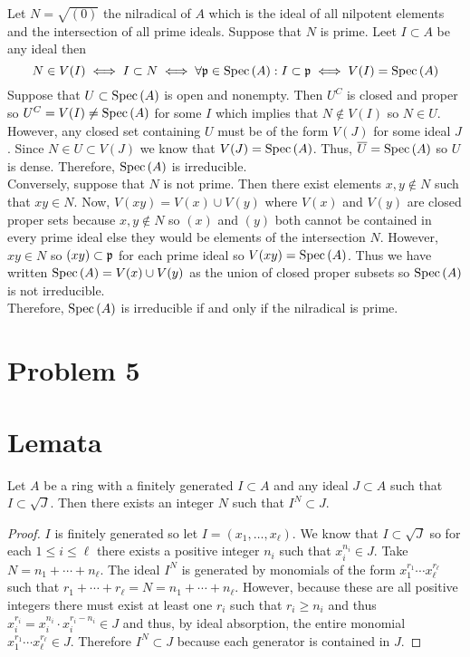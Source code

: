 \documentclass[12pt]{extarticle}
\begin{document}
Let $N = \sqrt{(0)}$ the nilradical of $A$ which is the ideal of all nilpotent elements and the intersection of all prime ideals. Suppose that $N$ is prime. Leet $I \subset A$ be any ideal then 
\[N \in V(I) \iff I \subset N \iff \forall \mathfrak{p} \in \mathrm{Spec}\left( A \right) : I \subset \mathfrak{p} \iff V(I) = \mathrm{Spec}\left( A \right)\]
Suppose that $U \subset \mathrm{Spec}\left( A \right)$ is open and nonempty. Then $U^C$ is closed and proper so $U^C = V(I) \neq \mathrm{Spec}\left( A \right)$ for some $I$ which implies that $N \notin V(I)$ so $N \in U$. However, any closed set containing $U$ must be of the form $V(J)$ for some ideal $J$. Since $N \in U \subset V(J)$ we know that $V(J) = \mathrm{Spec}\left( A \right)$. Thus, $\overline{U} = \mathrm{Spec}\left( A \right)$ so $U$ is dense. Therefore, $\mathrm{Spec}\left( A \right)$ is irreducible.
\bigskip\\
Conversely, suppose that $N$ is not prime. Then there exist elements $x,y \notin N$ such that $xy \in N$. Now, $V(xy) = V(x) \cup V(y)$ where $V(x)$ and $V(y)$ are closed proper sets because $x, y \notin N$ so $(x)$ and $(y)$ both cannot be contained in every prime ideal else they would be elements of the intersection $N$. However, $xy \in N$ so $(xy) \subset \mathfrak{p}$ for each prime ideal so $V(xy) = \mathrm{Spec}\left( A \right)$. Thus we have written $\mathrm{Spec}\left( A \right) = V(x) \cup V(y)$ as the union of closed proper subsets so $\mathrm{Spec}\left( A \right)$ is not irreducible.
\bigskip\\
Therefore, $\mathrm{Spec}\left( A \right)$ is irreducible if and only if the nilradical is prime. 

\section{Problem 5}



\section*{Lemata}

\begin{lemma} \label{fin_gen_rad_power}
Let $A$ be a ring with a finitely generated $I \subset A$ and any ideal $J \subset A$ such that $I \subset \sqrt{J}$. Then there exists an integer $N$ such that $I^N \subset J$.
\end{lemma}

\begin{proof}
$I$ is finitely generated so let $I = (x_1, \dots, x_{\ell})$. We know that $I \subset \sqrt{J}$ so for each $1 \le i \le \ell$ there exists a positive integer $n_i$ such that $x_i^{n_i} \in J$. Take $N = n_1 + \cdots + n_{\ell}$. The ideal $I^N$ is generated by monomials of the form $x_1^{r_1} \cdots x_{\ell}^{r_{\ell}}$ such that $r_1 + \cdots + r_{\ell} = N = n_1 + \cdots + n_{\ell}$. However, because these are all positive integers there must exist at least one $r_i$ such that $r_i \ge n_i$ and thus $x_i^{r_i} = x_i^{n_i} \cdot x_i^{r_i - n_i} \in J$ and thus, by ideal absorption, the entire monomial $x_1^{r_1} \cdots x_{\ell}^{r_{\ell}} \in J$. Therefore $I^N \subset J$ because each generator is contained in $J$. 
\end{proof}
\end{document}
